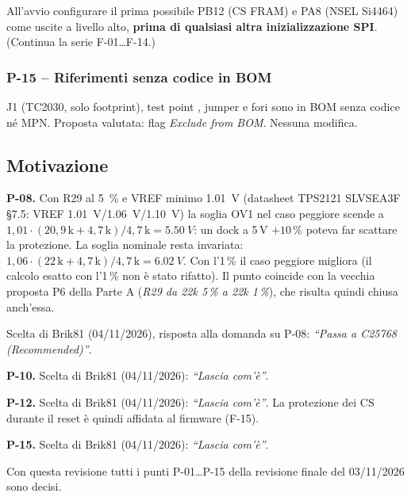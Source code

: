 \begin{tcolorbox}[enhanced,breakable,colback=boxokbg,colframe=boxok,boxrule=0.8pt,left=7pt,right=6pt,top=4pt,bottom=4pt,
  title={\sffamily\bfseries Nota firmware F-15 \textendash{} per il firmwarista (CS all'avvio)},fonttitle=\small,coltitle=white,colbacktitle=boxok]
All'avvio configurare il prima possibile PB12 (CS FRAM) e PA8 (NSEL Si4464) come uscite a livello alto, \textbf{prima di qualsiasi altra inizializzazione SPI}. (Continua la serie F-01\ldots F-14.)
\end{tcolorbox}

\subsubsection{P-15 -- Riferimenti senza codice in BOM}
J1 (TC2030, solo footprint), test point , jumper  e fori  sono in BOM senza codice né MPN. Proposta valutata: flag \emph{Exclude from BOM}. Nessuna modifica.

\subsection{Motivazione}
\textbf{P-08.} Con R29 al \SI{5}{\percent} e VREF minimo \SI{1.01}{V} (datasheet TPS2121 SLVSEA3F \S7.5: VREF \SI{1.01}{V}/\SI{1.06}{V}/\SI{1.10}{V}) la soglia OV1 nel caso peggiore scende a $1{,}01\cdot(20{,}9\,\mathrm{k}+4{,}7\,\mathrm{k})/4{,}7\,\mathrm{k} = \SI{5.50}{V}$: un dock a 5\,V $+10\,\%$ poteva far scattare la protezione. La soglia nominale resta invariata: $1{,}06\cdot(22\,\mathrm{k}+4{,}7\,\mathrm{k})/4{,}7\,\mathrm{k} = \SI{6.02}{V}$. Con l'1\,\% il caso peggiore migliora (il calcolo esatto con l'1\,\% non è stato rifatto). Il punto coincide con la vecchia proposta P6 della Parte A (\emph{R29 da 22k 5\,\% a 22k 1\,\%}), che risulta quindi chiusa anch'essa.

Scelta di Brik81 (04/11/2026), risposta alla domanda su P-08: \emph{``Passa a C25768 (Recommended)''}.

\textbf{P-10.} Scelta di Brik81 (04/11/2026): \emph{``Lascia com'è''}.

\textbf{P-12.} Scelta di Brik81 (04/11/2026): \emph{``Lascia com'è''}. La protezione dei CS durante il reset è quindi affidata al firmware (F-15).

\textbf{P-15.} Scelta di Brik81 (04/11/2026): \emph{``Lascia com'è''}.

Con questa revisione tutti i punti P-01\ldots P-15 della revisione finale del 03/11/2026 sono decisi.

